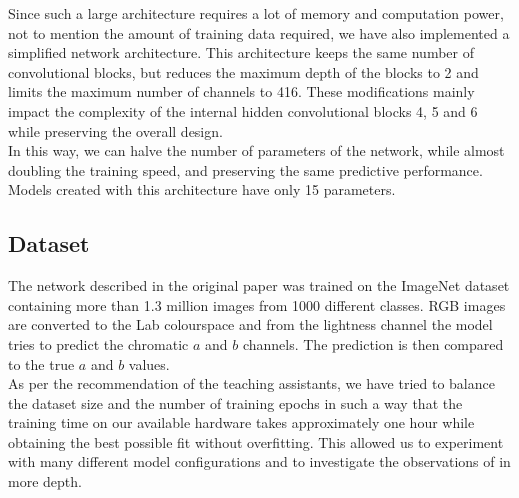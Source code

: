 \documentclass{article}
\begin{document}
Since such a large architecture requires a lot of memory and computation power, not to mention
the amount of training data required, we have also implemented a simplified network architecture.
This architecture keeps the same number of convolutional blocks, but reduces the maximum depth of the blocks
to 2 and limits the maximum number of channels to 416.
These modifications mainly impact the complexity of the internal hidden convolutional blocks 4, 5 and 6 while
preserving the overall design.\\
In this way, we can halve the number of parameters of the network, while almost doubling
the training speed, and preserving the same predictive performance.
Models created with this architecture have only 15 parameters.

\subsection{Dataset}
The network described in the original paper was trained on the ImageNet dataset \cite{imagenet} containing
more than 1.3 million images from 1000 different classes.
RGB images are converted to the Lab colourspace and from the lightness channel the model tries to predict
the chromatic $a$ and $b$ channels. The prediction is then compared to the true $a$ and $b$ values.\\
As per the recommendation of the teaching assistants, we have tried to balance the dataset size and the number of training epochs
in such a way that the training time on our available hardware takes approximately one hour while obtaining the
best possible fit without overfitting.
This allowed us to experiment with many different model configurations and to investigate the observations
of \cite{colourful} in more depth.
\end{document}
